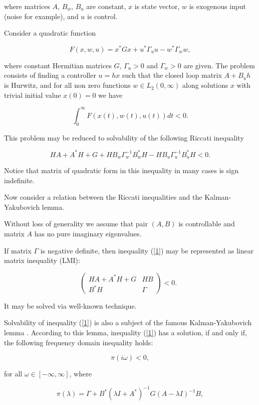 \documentclass[11pt, reqno]{amsart}
\theoremstyle{plain}
\begin{document}
\noindent where matrices $A$, $B_{w}$, $B_{u}$ are constant, $x$ is state vector, $w$ is exogenous input (noise for example), and $u$ is control. 

Consider a quadratic function 

$$ F(x,w,u) = x^{*}Gx + u^{*}\Gamma_{u}u - w^{*}\Gamma_{w}w,$$

\noindent where constant Hermitian matrices $G$, $\Gamma_{u}>0$ and $\Gamma_{w}>0$ are given. The problem consists of finding a controller $u=hx$ such that the closed loop matrix $A+B_{u}h$ is Hurwitz, and for all non zero functions $w\in L_{2}(0,\infty)$ along solutions $x$ with trivial initial value $x(0)=0$ we have

$$ \int_{0}^{\infty} F(x(t),w(t),u(t)) dt <0. $$

This problem may be reduced to solvability of the following 
Riccati inequality

$$ HA + A^{*}H + G + HB_{w}\Gamma_{w}^{-1}B_{w}^{*}H - HB_{u}\Gamma_{u}^{-1}B_{u}^{*}H < 0.$$

Notice that matrix of quadratic form in this inequality in many cases is sign indefinite.

Now consider a relation between the Riccati inequalities and the  Kalman-Yakubovich lemma.

Without loss of generality we assume that pair $(A,B)$ is controllable and matrix $A$ has no pure imaginary eigenvalues.

If matrix $\Gamma $ is negative definite, then inequality (\ref{1}) may be represented as
linear matrix inequality (LMI):

$$
\left(\begin{array}{cc}
HA + A^{*}H + G&HB \\
 B^{*}H&\Gamma \end{array}\right)  < 0. \; \;
$$

It may be solved via well-known technique.

Solvability of inequality (\ref{1}) is also a subject of the famous Kalman-Yakubovich 
lemma \cite{frequencydomain}. According to this lemma, inequality (\ref{1}) has a solution, 
if and only if, the following frequency domain inequality holds:

\begin{equation}\label{2}
\pi (i\omega ) < 0,
\end{equation}

\noindent for all $\omega \in [-\infty , \infty ]$, where

$$
\pi (\lambda ) = \Gamma  + B^{*}(\lambda I+A^{*})^{-1}G(A-\lambda I)^{-1}B,
$$
\end{document}
